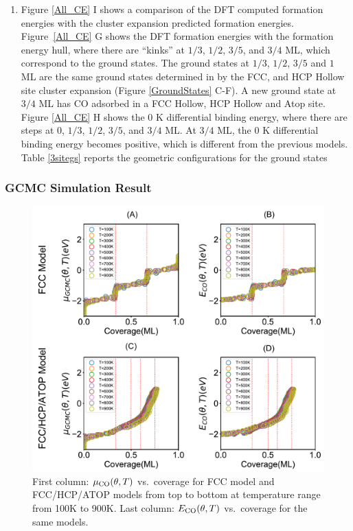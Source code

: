 \documentclass[11pt]{article}
\begin{document}
\begin{enumerate}
\item Figure \ref{All_CE} I shows a comparison of the DFT computed formation energies with the cluster expansion predicted formation energies. Figure~\ref{All_CE} G shows the DFT formation energies with the formation energy hull, where there are ``kinks'' at $1/3$, $1/2$, $3/5$, and $3/4$ ML, which correspond to the ground states. The ground states at $1/3$, $1/2$, $3/5$ and $1$ ML are the same ground states determined in by the FCC, and HCP Hollow site cluster expansion (Figure \ref{GroundStates} C-F). A new ground state at $3/4$ ML has CO adsorbed in a FCC Hollow, HCP Hollow and Atop site. Figure \ref{All_CE} H shows the 0 K differential binding energy, where there are steps at 0, $1/3$, $1/2$, $3/5$, and $3/4$ ML. At $3/4$ ML, the 0 K differential binding energy becomes positive, which is different from the previous models. Table \ref{3sitegs} reports the geometric configurations for the ground states
\end{enumerate}
 
\clearpage

\subsubsection*{GCMC Simulation Result}
\begin{figure} [h]
\centering
\includegraphics[width=15cm]{Figure/GCMC1.pdf}
\caption{First column: $\mu_{\ce{CO}}(\theta,T)$ vs.\ coverage for FCC model and FCC/HCP/ATOP models from top to bottom at temperature range from 100K to 900K. Last column: $E_{\ce{CO}}(\theta,T)$ vs.\ coverage for the same models.}
\label{sumgcmc}
\end{figure}
\end{document}
